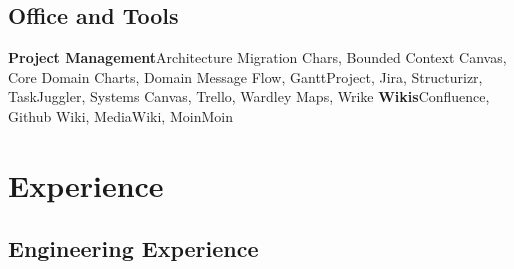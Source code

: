 \documentclass[11pt,a4paper,nolmodern,colorlinks=true,linkcolor=true]{moderncv}
\begin{document}
\subsection{Office and Tools}
           {\textbf{Project Management}}{Architecture Migration Chars, Bounded Context Canvas, Core Domain Charts, Domain Message Flow, GanttProject, Jira, Structurizr, TaskJuggler, Systems Canvas, Trello, Wardley Maps, Wrike}
           {\textbf{Wikis}}{Confluence, Github Wiki, MediaWiki, MoinMoin}

\newpage

\section{Experience}
\subsection{Engineering Experience}

\end{document}

